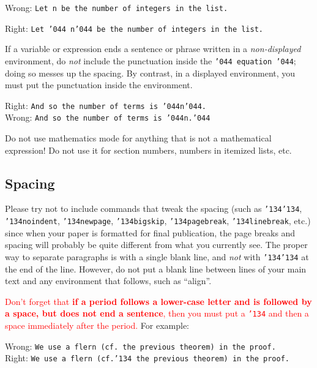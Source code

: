 \documentclass[12pt]{article}
\begin{document}
\medskip

\noindent Wrong:  {\tt Let n be the number of integers in the list.}

\noindent Right:  {\tt Let \char'044 n\char'044\ be the number of integers in the list.}

\medskip

If a variable or expression ends a sentence or phrase written in 
a {\it non-displayed\/} environment,
do {\it not\/} include the
punctuation inside the {\tt \char'044 equation \char'044};
doing so messes up the spacing.    By contrast, in a displayed
environment, you must put the punctuation inside the environment.

\medskip

\noindent Right:  {\tt And so the number of terms is \char'044n\char'044.} \\
\noindent Wrong:  {\tt And so the number of terms is \char'044n.\char'044} \\

\medskip

Do not use mathematics mode for anything that is not a mathematical expression!
Do not use it for section numbers, numbers in itemized lists, etc.

\subsection{Spacing}

    Please try not to include commands that tweak the spacing (such as
{\tt \char'134\char'134},
{\tt \char'134noindent}, {\tt \char'134newpage},
{\tt \char'134bigskip}, {\tt \char'134pagebreak}, {\tt \char'134linebreak}, 
etc.) since when your paper is formatted for final publication, the page
breaks and spacing will probably be quite different from what you currently
see.    The proper way to separate paragraphs is with a single blank
line, and {\it not\/} with {\tt \char'134\char'134} at the end of the line.
However, do not put a blank line between lines of your main text and
any environment that follows, such as ``align''.

     \textcolor{red}{Don't forget that \textbf{if a period
follows a lower-case letter and is followed by a space, but does
not end a sentence}, then you must
put a {\tt \char'134} and then a space immediately 
after the period.}  For example:

\medskip

\noindent Wrong:
{\tt We use a flern (cf.\ the previous theorem) in the proof.} \\
\noindent Right:  
{\tt We use a flern (cf.\char'134\ the previous theorem) in the proof.} \\
\end{document}
